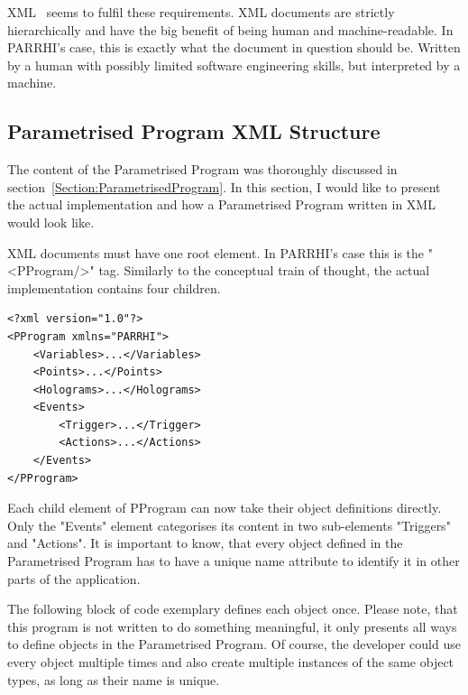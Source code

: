 XML~\cite{xmlW3C} seems to fulfil these requirements. XML documents are strictly hierarchically and have the big benefit of being human and machine-readable. In PARRHI's case, this is exactly what the document in question should be. Written by a human with possibly limited software engineering skills, but interpreted by a machine.


\subsection{Parametrised Program XML Structure}
The content of the Parametrised Program was thoroughly discussed in section~\ref{Section:ParametrisedProgram}. In this section, I would like to present the actual implementation and how a Parametrised Program written in XML would look like.

XML documents must have one root element. In PARRHI's case this is the "<PProgram/>" tag. Similarly to the conceptual train of thought, the actual implementation contains four children.

\begin{lstlisting}
<?xml version="1.0"?>
<PProgram xmlns="PARRHI">
	<Variables>...</Variables>
	<Points>...</Points>
	<Holograms>...</Holograms>
	<Events>
		<Trigger>...</Trigger>
		<Actions>...</Actions>
	</Events>
</PProgram>
\end{lstlisting}

Each child element of PProgram can now take their object definitions directly. Only the "Events" element categorises its content in two sub-elements "Triggers" and "Actions". It is important to know, that every object defined in the Parametrised Program has to have a unique name attribute to identify it in other parts of the application. 

The following block of code exemplary defines each object once. Please note, that this program is not written to do something meaningful, it only presents all ways to define objects in the Parametrised Program. Of course, the developer could use every object multiple times and also create multiple instances of the same object types, as long as their name is unique.

